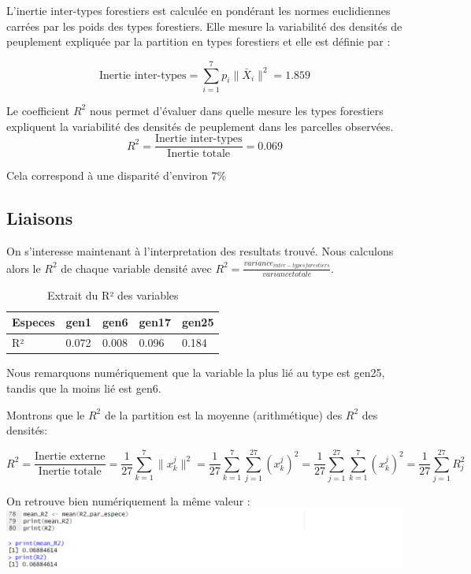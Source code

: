 \documentclass{article}
\begin{document}
L'inertie inter-types forestiers est calculée en pondérant les normes euclidiennes carrées par les poids des types forestiers. Elle mesure la variabilité des densités de peuplement expliquée par la partition en types forestiers et elle est définie par :

\[
\text{Inertie inter-types} = \sum_{i=1}^{7} p_i \|\bar{X}_i\|^2 = 1.859
\]

Le coefficient $R^2$ nous permet d'évaluer dans quelle mesure les types forestiers expliquent la variabilité des densités de peuplement dans les parcelles observées.
\[
R^2 = \frac{\text{Inertie inter-types}}{\text{Inertie totale}}=0.069
\]

Cela correspond à une disparité d'environ 7\%

\subsection{Liaisons}

On s'interesse maintenant à l'interpretation des resultats trouvé. Nous calculons alors le $R^2$ de chaque variable densité avec
 $R^2 = \frac{variance_{inter -typesforestiers}}{variance totale}$.

\begin{table}[H]
    \centering
    \begin{tabular}{|l|l|l|l|l|}
    \hline
    Especes & gen1  & gen6  & gen17 & gen25 \\ \hline
    R²      & 0.072 & 0.008 & 0.096 & 0.184 \\ \hline
    \end{tabular}
    \centering
    \caption{Extrait du R² des variables}
    \end{table}


Nous remarquons numériquement que la variable la plus lié au type est gen25, tandis que la moins lié est gen6.

Montrons que le $R^2$ de la partition est la moyenne (arithmétique) des $R^2$ des densités:

\[
R^2 = \frac{\text{Inertie externe}}{\text{Inertie totale}}
= \frac{1}{27} \sum_{k=1}^{7} \lVert x_k^j \rVert^2
= \frac{1}{27} \sum_{k=1}^{7} \sum_{j=1}^{27} (x_k^j)^2
= \frac{1}{27} \sum_{j=1}^{27} \sum_{k=1}^{7} (x_k^j)^2
= \frac{1}{27} \sum_{j=1}^{27} R_j^2
\]

On retrouve bien numériquement la même valeur :
\\
\includegraphics[width=1.5\textwidth]{preuve_info_p1.png}
\end{document}
